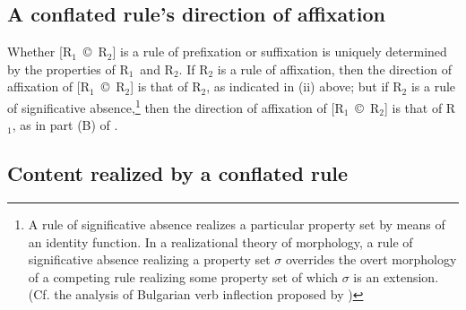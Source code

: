 \documentclass[output=paper,
modfonts
]{LSP/langsci}
\begin{document}
\subsection{A conflated rule’s direction of affixation}

Whether [R$_{1}$~©~R$_{2}$] is a rule of prefixation or suffixation is uniquely determined by the properties of R$_{1}$~and R$_{2}$.  If R$_{2}$ is a rule of affixation, then the direction of affixation of [R$_{1}$~©~R$_{2}$] is that of R$_{2}$, as indicated in (ii) above; but if R$_{2}$ is a rule of significative absence,\footnote{A rule of significative absence realizes a particular property set by means of an identity function.  In a realizational theory of morphology, a rule of significative absence realizing a property set $\sigma $ overrides the overt morphology of a competing rule realizing some property set of which $\sigma $ is an extension.  (Cf. the analysis of Bulgarian verb inflection proposed by \citealt[441ff]{Stump2001})}  then the direction of affixation of [R$_{1}$~©~R$_{2}$] is that of R$_{1}$, as in part (B) of .

\subsection{Content realized by a conflated rule} 
\end{document}
